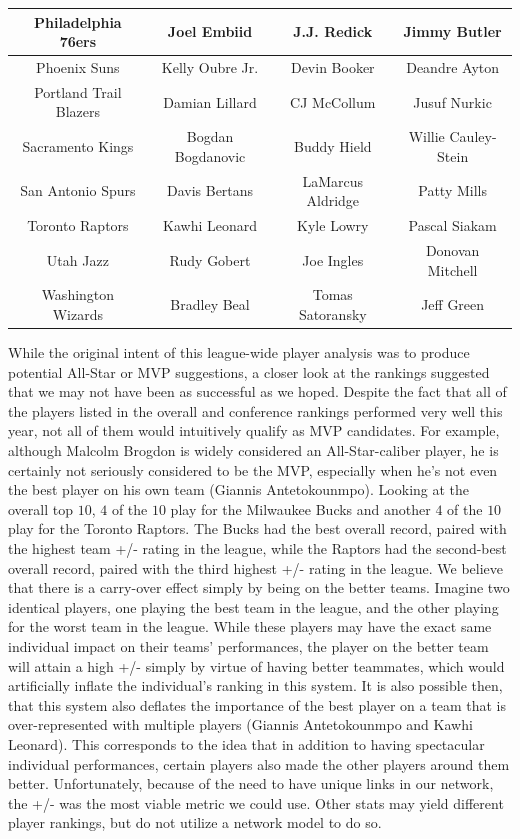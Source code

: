 \documentclass[12pt]{article}%
\begin{document}
\begin{center}
\begin{tabular}{|c|c c c|}
Philadelphia 76ers &Joel Embiid&J.J. Redick&Jimmy Butler\\\hline
Phoenix Suns &Kelly Oubre Jr.&Devin Booker&Deandre Ayton\\\hline
Portland Trail Blazers  &Damian Lillard&CJ McCollum&Jusuf Nurkic\\\hline
Sacramento Kings &Bogdan Bogdanovic&Buddy Hield&Willie Cauley-Stein\\\hline
San Antonio Spurs &Davis Bertans&LaMarcus Aldridge&Patty Mills\\\hline
Toronto Raptors & Kawhi Leonard&Kyle Lowry&Pascal Siakam\\\hline
Utah Jazz &Rudy Gobert&Joe Ingles&Donovan Mitchell\\\hline
Washington Wizards &Bradley Beal&Tomas Satoransky&Jeff Green\\\hline
\end{tabular}
\end{center}
\null\quad\quad While the original intent of this league-wide player analysis was to produce potential All-Star or MVP suggestions, a closer look at the rankings suggested that we may not have been as successful as we hoped. Despite the fact that all of the players listed in the overall and conference rankings performed very well this year, not all of them would intuitively qualify as MVP candidates. For example, although Malcolm Brogdon is widely considered an All-Star-caliber player, he is certainly not seriously considered to be the MVP, especially when he's not even the best player on his own team (Giannis Antetokounmpo). Looking at the overall top $10$, $4$ of the $10$ play for the Milwaukee Bucks and another $4$ of the $10$ play for the Toronto Raptors. The Bucks had the best overall record, paired with the highest team +/- rating in the league, while the Raptors had the second-best overall record, paired with the third highest +/- rating in the league. We believe that there is a carry-over effect simply by being on the better teams. Imagine two identical players, one playing the best team in the league, and the other playing for the worst team in the league. While these players may have the exact same individual impact on their teams' performances, the player on the better team will attain a high +/- simply by virtue of having better teammates, which would artificially inflate the individual's ranking in this system. It is also possible then, that this system also deflates the importance of the best player on a team that is over-represented with multiple players (Giannis Antetokounmpo and Kawhi Leonard). This corresponds to the idea that in addition to having spectacular individual performances, certain players also made the other players around them better. Unfortunately, because of the need to have unique links in our network, the +/- was the most viable metric we could use. Other stats may yield different player rankings, but do not utilize a network model to do so.\\
\end{document}
